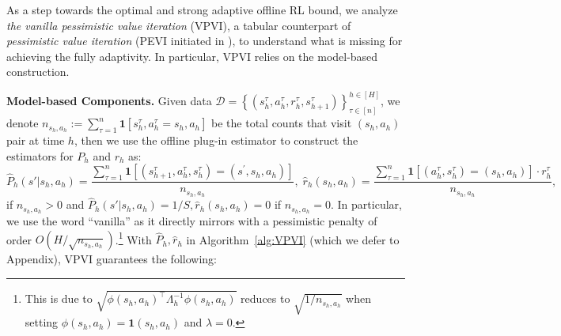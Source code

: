 

As a step towards the optimal and strong adaptive offline RL bound, we analyze \emph{the vanilla pessimistic value iteration} (VPVI), a tabular counterpart of \emph{pessimistic value iteration} (PEVI initiated in \cite{jin2020pessimism}), to understand what is missing for achieving the fully adaptivity. In particular, VPVI relies on the model-based construction.



\textbf{Model-based Components.} Given data {\small$\mathcal{D}=\left\{\left(s_{h}^{\tau}, a_{h}^{\tau}, r_{h}^{\tau}, s_{h+1}^{\tau}\right)\right\}_{\tau\in[n]}^{h \in[H]}$}, we denote $n_{s_h,a_h}:=\sum_{\tau=1}^n\mathbf{1}[s_h^{\tau},a_h^{\tau}=s_h,a_h]$ be the total counts that visit $(s_h,a_h)$ pair at time $h$, then we use the offline plug-in estimator to construct the estimators for ${P_h}$ and $r_h$ as:
{\small
\begin{equation}\label{eqn:mb_est}
\widehat{P}_h(s'|s_h,a_h)=\frac{\sum_{\tau=1}^n\mathbf{1}[(s^{\tau}_{h+1},a^{\tau}_h,s^{\tau}_h)=(s^\prime,s_h,a_h)]}{n_{s_h,a_h}},\; \widehat{r}_h(s_h,a_h)=\frac{\sum_{\tau=1}^n\mathbf{1}[(a^{\tau}_h,s^{\tau}_h)=(s_h,a_h)]\cdot r_h^\tau}{n_{s_h,a_h}},
\end{equation}
}if $n_{s_h,a_h}>0$ and $\widehat{P}_h(s'|s_h,a_h)={1}/{S},\widehat{r}_h(s_h,a_h)=0$ if $n_{s_h,a_h}=0$. In particular, we use the word ``vanilla'' as it directly mirrors \cite{jin2020pessimism} with a pessimistic penalty of order $O(H/\sqrt{n_{s_h,a_h}})$.\footnote{This is due to $\sqrt{\phi\left(s_{h}, a_{h}\right)^{\top} \Lambda_{h}^{-1} \phi\left(s_{h}, a_{h}\right)}$ reduces to $\sqrt{{1}/n_{s_h,a_h}}$ when setting $\phi(s_h,a_h)=\mathbf{1}(s_h,a_h)$ and $\lambda=0$.} With $\widehat{P}_h,\widehat{r}_h$ in Algorithm~\ref{alg:VPVI} (which we defer to Appendix), VPVI guarantees the following:



